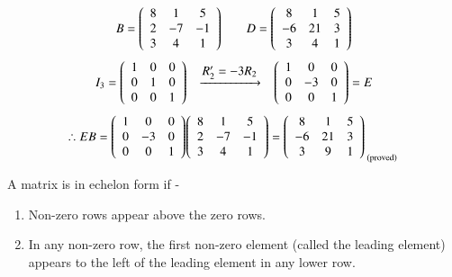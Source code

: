\documentclass[12pt]{article}
\newcommand{\ro}[2][]{
\tab \xrightarrow[\scalebox{1}{$#1$}]{\scalebox{1}{$#2$}} \tab
}
\renewenvironment{pmatrix}
{\left(\begin{array}{ccc}}
{\end{array}\right)}
\begin{document}
\begin{equation*}
   B =\begin{pmatrix}
      8 & 1 & 5 \\ 2 & -7 & -1 \\ 3 & 4 & 1
   \end{pmatrix} \quad \quad D=\begin{pmatrix}
      8 & 1 & 5 \\ -6 & 21 & 3 \\ 3 & 4 & 1
   \end{pmatrix} \\
\end{equation*}
\begin{equation*}
   I_3 =\begin{pmatrix}
      1 & 0 & 0 \\ 0 & 1 & 0 \\ 0 & 0 & 1
   \end{pmatrix} \ro{R_2'=-3R_2}\begin{pmatrix}
      1 & 0 & 0 \\ 0 & -3 & 0 \\ 0 & 0 & 1
   \end{pmatrix}=E \\
\end{equation*}
   \begin{equation*}
   \therefore EB =\begin{pmatrix}
      1 & 0 & 0 \\ 0 & -3 & 0 \\ 0 & 0 & 1
   \end{pmatrix}\begin{pmatrix}
      8 & 1 & 5 \\ 2 & -7 & -1 \\ 3 & 4 & 1
   \end{pmatrix}=\begin{pmatrix}
      8 & 1 & 5 \\ -6 & 21 & 3 \\ 3 & 9 & 1
   \end{pmatrix}_\text { (proved) }
\end{equation*}

A matrix is in echelon form if -
\begin{enumerate}[label=(\arabic*)]
   \item Non-zero rows appear above the zero rows.
   \item In any non-zero row, the first non-zero element (called the leading element) appears to the left of the leading element in any lower row.
\end{enumerate}
\end{document}
